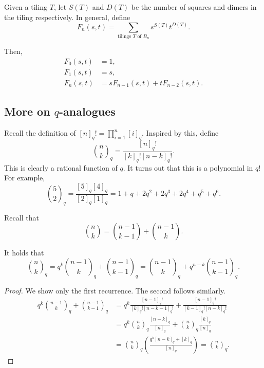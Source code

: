 	Given a tiling $T$, let $S(T)$ and $D(T)$ be the number of squares and dimers in the tiling respectively.
	In general, define
	\begin{equation}
		\label{eqn: board tiling polynomial}
		F_n(s,t) = \sum_{\text{tilings $T$ of $B_n$}} s^{S(T)} t^{D(T)}.
	\end{equation}

	Then,
	\begin{align*}
		F_0(s,t) &= 1, \\
		F_1(s,t) &= s, \\
		F_n(s,t) &= sF_{n-1}(s,t) + tF_{n-2}(s,t).
	\end{align*}

\subsection{More on $q$-analogues}

	Recall the definition of $[n]_q! = \prod_{i=1}^n [i]_q$. Inspired by this, define
	\[ \binom{n}{k}_q = \frac{[n]_q!}{[k]_q![n-k]_q!}. \]
	This is clearly a rational function of $q$. It turns out that this is a polynomial in $q$! For example,
	\[ \binom{5}{2}_q = \frac{[5]_q[4]_q}{[2]_q[1]_q} = 1 + q + 2q^2 + 2q^3 + 2q^4 + q^5 + q^6. \]

	Recall that
	\[ \binom{n}{k} = \binom{n-1}{k-1} + \binom{n-1}{k}. \]


	\begin{fprop}
		It holds that
		\[ \binom{n}{k}_q = q^k \binom{n-1}{k}_q + \binom{n-1}{k-1}_q = \binom{n-1}{k}_q + q^{n-k} \binom{n-1}{k-1}_q . \]
	\end{fprop}
	\begin{proof}
		We show only the first recurrence. The second follows similarly.
		\begin{align*}
			q^k \binom{n-1}{k}_q + \binom{n-1}{k-1}_q &= q^k \frac{[n-1]_q!}{[k]_q! [n-k-1]_q!} + \frac{[n-1]_q!}{[k-1]_q![n-k]_q!} \\
				&=  q^k \binom{n}{k}_q \frac{[n-k]_q}{[n]_q} + \binom{n}{k}_q \frac{[k]_q}{[n]_q} \\
				&= \binom{n}{k}_q \left( \frac{q^k[n-k]_q + [k]_q}{[n]_q} \right) = \binom{n}{k}_q. 
		\end{align*}
	\end{proof}

